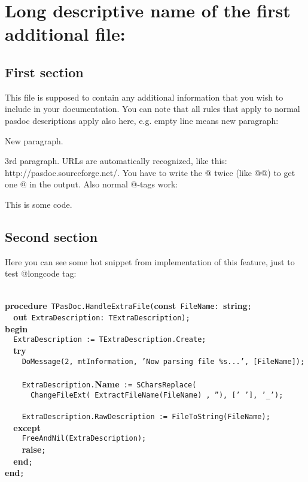 \documentclass{report}
\begin{document}
\chapter{Long descriptive name of the first additional file:}
 

 

\section{First section}


This file is supposed to contain any additional information that you wish to include in your documentation. You can note that all rules that apply to normal pasdoc descriptions apply also here, e.g. empty line means new paragraph:

New paragraph.

3rd paragraph. URLs are automatically recognized, like this: http://pasdoc.sourceforge.net/. You have to write the @ twice (like @@) to get one @ in the output. Also normal @{-}tags work: \begin{ttfamily}This is some code.\end{ttfamily}

\section{Second section}


Here you can see some hot snippet from implementation of this feature, just to test @longcode tag:

\texttt{\\\nopagebreak[3]
}\textbf{procedure}\texttt{~TPasDoc.HandleExtraFile(}\textbf{const}\texttt{~FileName:~}\textbf{string}\texttt{;\\\nopagebreak[3]
~~}\textbf{out}\texttt{~ExtraDescription:~TExtraDescription);\\\nopagebreak[3]
}\textbf{begin}\texttt{\\\nopagebreak[3]
~~ExtraDescription~:=~TExtraDescription.Create;\\\nopagebreak[3]
~~}\textbf{try}\texttt{\\\nopagebreak[3]
~~~~DoMessage(2,~mtInformation,~'Now~parsing~file~{\%}s...',~[FileName]);\\\nopagebreak[3]
\\\nopagebreak[3]
~~~~ExtraDescription.}\textbf{Name}\texttt{~:=~SCharsReplace(\\\nopagebreak[3]
~~~~~~ChangeFileExt(~ExtractFileName(FileName)~,~''),~['~'],~'{\_}');\\\nopagebreak[3]
\\\nopagebreak[3]
~~~~ExtraDescription.RawDescription~:=~FileToString(FileName);\\\nopagebreak[3]
~~}\textbf{except}\texttt{\\\nopagebreak[3]
~~~~FreeAndNil(ExtraDescription);\\\nopagebreak[3]
~~~~}\textbf{raise}\texttt{;\\\nopagebreak[3]
~~}\textbf{end}\texttt{;\\\nopagebreak[3]
}\textbf{end}\texttt{;\\
}
\end{document}
